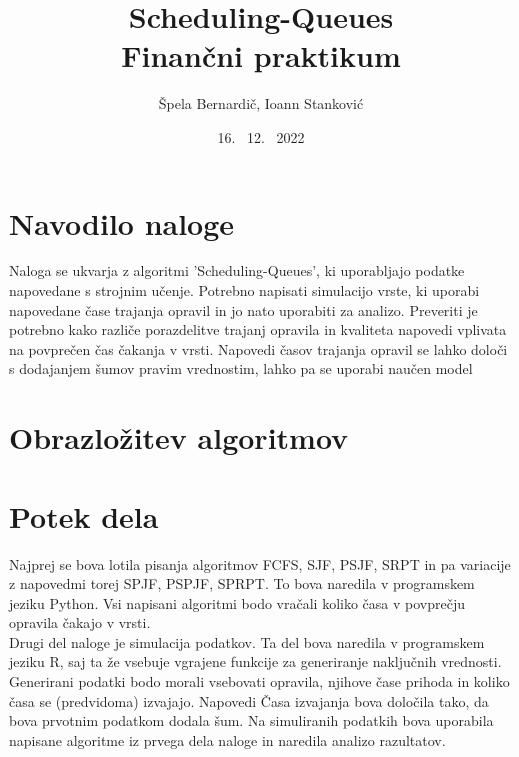\documentclass[a4paper, pt14]{article}
\begin{document}
\title{%
Scheduling-Queues\\
  \large Finančni praktikum}
\author{Špela Bernardič, Ioann Stanković}
\date{16. \ 12. \ 2022}

\maketitle

\section{Navodilo naloge}
Naloga se ukvarja z algoritmi 'Scheduling-Queues', ki uporabljajo podatke napovedane s strojnim učenje.
Potrebno napisati simulacijo vrste, ki uporabi napovedane čase trajanja opravil in jo nato uporabiti za analizo.
Preveriti je potrebno kako različe porazdelitve trajanj opravila in kvaliteta napovedi vplivata na povprečen čas čakanja v vrsti.
Napovedi časov trajanja opravil se lahko določi s dodajanjem šumov pravim vrednostim, lahko pa se uporabi naučen model


\section{Obrazložitev algoritmov}

\section{Potek dela}

Najprej se bova lotila pisanja algoritmov FCFS, SJF, PSJF, SRPT  in pa variacije z napovedmi torej SPJF, PSPJF, SPRPT. To bova naredila v programskem jeziku Python.
Vsi napisani algoritmi bodo vračali koliko časa v povprečju opravila čakajo v vrsti.\\
Drugi del naloge je simulacija podatkov. Ta del bova naredila v programskem jeziku R, saj ta že vsebuje vgrajene funkcije za generiranje naključnih vrednosti.
Generirani podatki bodo morali vsebovati opravila, njihove čase prihoda in koliko časa se (predvidoma) izvajajo.
Napovedi Časa izvajanja bova določila tako, da bova prvotnim podatkom dodala šum.
Na simuliranih podatkih bova uporabila napisane algoritme iz prvega dela naloge in naredila analizo razultatov.
\end{document}
